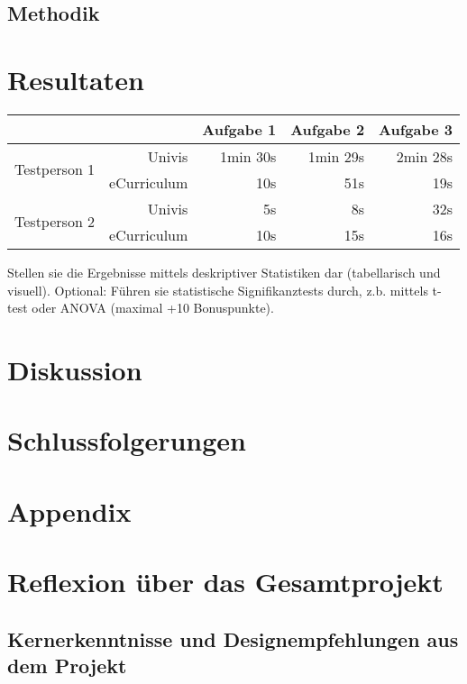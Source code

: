 \documentclass[a4paper,10pt]{scrartcl}
\begin{document}
\subsection{Methodik}



\section{Resultaten} 

\begin{center}
\begin{tabular}{r|r|r|r|r}
    & & Aufgabe 1 & Aufgabe 2 & Aufgabe 3 \\
    \hline
    \multirow{2}{*}{Testperson 1} & Univis & 1min 30s & 1min 29s & 2min 28s\\
    & eCurriculum & 10s & 51s & 19s\\
    \hline
    \multirow{2}{*}{Testperson 2} & Univis & 5s & 8s & 32s\\
    & eCurriculum & 10s & 15s & 16s\\
\end{tabular}
\end{center}

Stellen sie die Ergebnisse mittels deskriptiver Statistiken dar (tabellarisch und visuell). 
Optional: Führen sie statistische Signifikanztests durch, z.b. mittels t-test oder ANOVA (maximal +10 Bonuspunkte). 

\section{Diskussion}


\section{Schlussfolgerungen}


\section{Appendix}

\section{Reflexion über das Gesamtprojekt}

\subsection{Kernerkenntnisse und Designempfehlungen aus dem Projekt}
\end{document}
